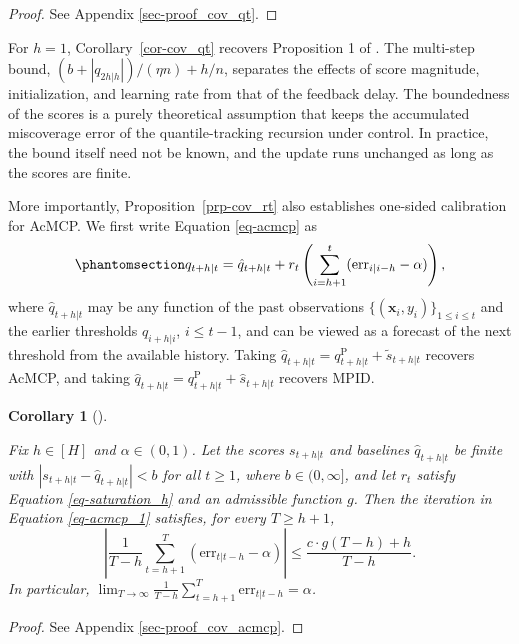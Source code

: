 \documentclass[
  american,
  12pt]{article}
\theoremstyle{plain}
\newtheorem{corollary}{Corollary}[section]
\theoremstyle{plain}
\theoremstyle{remark}
\begin{document}
\begin{proof}
See Appendix \ref{sec-proof_cov_qt}.
\end{proof}

For \(h=1\), Corollary~\ref{cor-cov_qt} recovers Proposition 1 of
\citet{angelopoulos2024}. The multi-step bound,
\((b+|q_{2h|h}|)/(\eta n)+h/n\), separates the effects of score
magnitude, initialization, and learning rate from that of the feedback
delay. The boundedness of the scores is a purely theoretical assumption
that keeps the accumulated miscoverage error of the quantile-tracking
recursion under control. In practice, the bound itself need not be
known, and the update runs unchanged as long as the scores are finite.

More importantly, Proposition~\ref{prp-cov_rt} also establishes
one-sided calibration for AcMCP. We first write Equation
\eqref{eq-acmcp} as \begin{equation}\phantomsection\label{eq-acmcp_1}{
q_{t+h|t}=\hat{q}_{t+h|t}+r_t\left(\sum_{i=h+1}^t (\mathrm{err}_{i|i-h}-\alpha)\right),
}\end{equation} where \(\hat{q}_{t+h|t}\) may be any function of the
past observations \(\{(\bm{x}_i,y_i)\}_{1\leq i\leq t}\) and the earlier
thresholds \(q_{i+h|i}\), \(i\leq t-1\), and can be viewed as a forecast
of the next threshold from the available history. Taking
\(\hat q_{t+h|t}=q^{\mathrm P}_{t+h|t}+\tilde s_{t+h|t}\) recovers
AcMCP, and taking
\(\hat q_{t+h|t}=q^{\mathrm P}_{t+h|t}+\hat s_{t+h|t}\) recovers MPID.

\begin{corollary}[]\protect\hypertarget{cor-cov_acmcp}{}\label{cor-cov_acmcp}

Fix \(h\in[H]\) and \(\alpha\in(0,1)\). Let the scores \(s_{t+h|t}\) and
baselines \(\hat q_{t+h|t}\) be finite with
\(|s_{t+h|t}-\hat q_{t+h|t}|<b\) for all \(t\geq1\), where
\(b\in(0,\infty]\), and let \(r_t\) satisfy Equation
\eqref{eq-saturation_h} and an admissible function \(g\). Then the
iteration in Equation \eqref{eq-acmcp_1} satisfies, for every
\(T\geq h+1\), \[
\left|\frac{1}{T-h}\sum_{t=h+1}^{T}(\mathrm{err}_{t|t-h}-\alpha)\right|
\leq \frac{c \cdot g(T-h)+h}{T-h}.
\] In particular,
\(\lim_{T\to\infty}\frac{1}{T-h}\sum_{t=h+1}^{T}\mathrm{err}_{t|t-h}=\alpha\).

\end{corollary}

\begin{proof}
See Appendix \ref{sec-proof_cov_acmcp}.
\end{proof}
\end{document}
